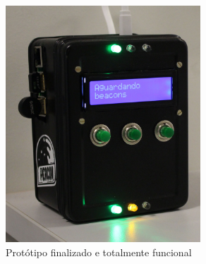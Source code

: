 \begin{figure}[htb]
	\caption{\label{fig:prod-final}Protótipo finalizado e totalmente funcional}
	\begin{center}
		\includegraphics[width=0.65\textwidth]{img/prod-final.jpg}
	\end{center}
\end{figure}

